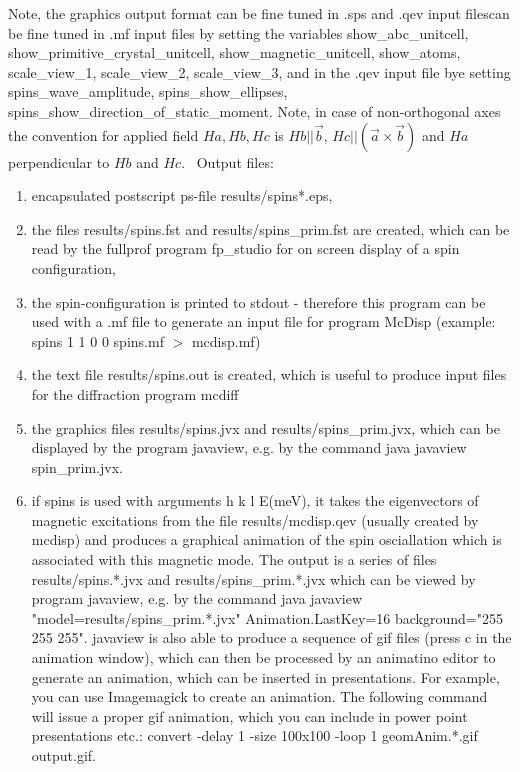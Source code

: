 Note, the graphics output format can be fine tuned in .sps and .qev input filescan be fine tuned in .mf input %
files by setting the variables
{\prg show\_abc\_unitcell, show\_primitive\_crystal\_unitcell, show\_magnetic\_unitcell, show\_atoms, %
scale\_view\_1,
scale\_view\_2, scale\_view\_3}, and in
the  .qev input file bye setting 
{\prg spins\_wave\_amplitude, spins\_show\_ellipses, spins\_show\_direction\_of\_static\_moment}.
                          Note, in case of non-orthogonal axes the convention 
                           for applied field $Ha, Hb,Hc$ 
                            is $Hb||\vec b$, $Hc||(\vec a \times \vec b)$ and $Ha$ perpendicular to $Hb$ and $Hc$.
\
Output files:
\begin{enumerate}
  \item encapsulated postscript ps-file {\prg results/spins*.eps}, 
  \item the files {\prg results/spins.fst} and {\prg results/spins\_prim.fst} are created, 
                which can be read by the fullprof program {\prg fp\_studio}
                for on screen display\index{display} of a spin configuration,
  \item the spin-configuration is printed to stdout - therefore
                               this program can be used with a .mf file 
			       to generate an input file
			       for program {\prg  McDisp} (example: {\prg spins 1 1 0 0 spins.mf $>$ mcdisp.mf})  
  \item the text file {\prg results/spins.out} is created, which is useful to produce input files for
              the diffraction program {\prg mcdiff\index{mcdiff}}
  \item the graphics files {\prg results/spins.jvx} and {\prg results/spins\_prim.jvx}, which can be displayed
         by the program {\prg javaview}, e.g. by the command {\prg java javaview spin\_prim.jvx}.
  \item if {\prg spins} is used with arguments {\prg h k l E(meV)}, it takes the eigenvectors of magnetic %
excitations
        from the file {\prg results/mcdisp.qev} (usually created by {\prg mcdisp}) and produces a graphical
        animation of the spin osciallation which is associated with this magnetic mode. The output is a series
        of files {\prg results/spins.*.jvx} and {\prg results/spins\_prim.*.jvx} which can be viewed by program
        {\prg javaview}, e.g. by the command {\prg java javaview "model=results/spins\_prim.*.jvx" 
        Animation.LastKey=16 background="255 255 255"}.  {\prg javaview} is also able to produce a sequence
		of gif files (press c in the animation window), which can then be processed by an animatino editor
		to generate an animation, which can be inserted in presentations. For example, you can use {\prg %
Imagemagick}
        to create an animation. The following command will issue a proper gif animation, which you can include in %
power point        
        presentations etc.: {\prg convert -delay 1 -size 100x100 -loop 1 geomAnim.*.gif output.gif}.
 \end{enumerate}

